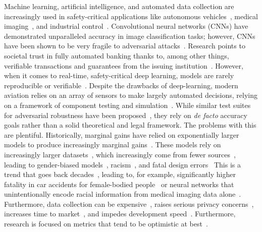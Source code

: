 Machine learning, artificial intelligence, and automated data collection are increasingly used in safety-critical applications like autonomous vehicles~\cite{grigorescu2020survey,al2017deep}, medical imaging~\cite{ching2017opportunities,sahiner2019deep}, and industrial control~\cite{fukuda1992theory,monmasson2011fpgas}.
Convolutional neural networks (CNNs) have demonstrated unparalleled accuracy in image classification tasks; however, CNNs have been shown to be very fragile to adversarial attacks~\cite{miller_adversarial_2020,finlayson2018adversarial}.
Research points to societal trust in fully automated banking thanks to, among other things, verifiable transactions and guarantees from the issuing institution~\cite{safetyframework}.
However, when it comes to real-time, safety-critical deep learning, models are rarely reproducible or verifiable~\cite{tsipras_robustness_2019,carlini_towards_2017}.
Despite the drawbacks of deep-learning, modern aviation relies on an array of sensors to make largely automated decisions, relying on a framework of component testing and simulation~\cite{aviation}.
While similar test suites for adversarial robustness have been proposed~\cite{carlini_towards_2017,chakraborty_adversarial_2018}, they rely on \textit{de facto} accuracy goals rather than a solid theoretical and legal framework.
The problems with this are plentiful.
Historically, marginal gains have relied on exponentially larger models to produce increasingly marginal gains~\cite{desislavov2021compute}.
These models rely on increasingly larger datasets~\cite{desislavov2021compute,vapnik1994measuring,blumer1989learnability}, which increasingly come from fewer sources~\cite{koch2021reduced}, leading to gender-biased models~\cite{lu2020gender}, racism~\cite{buolamwini2018gender}, and fatal design errors~\cite{banks2018driver} This is a trend that goes back decades~\cite{corsaro1982something,ramirez2000resource,buolamwini2018gender}, leading to, for example, significantly higher fatality in car accidents for female-bodied people~\cite{evans2001gender} or neural networks that unintentionally encode racial information from medical imaging data alone~\cite{gichoya2022ai}.
Furthermore, data collection can be expensive~\cite{roh2019survey}, raises serious privacy concerns~\cite{bloom2017self}, increases time to market~\cite{lam2004new}, and impedes development speed~\cite{zirger1996effect}.
Furthermore, research is focused on metrics that tend to be optimistic at best~\cite{madry2017towards}.

